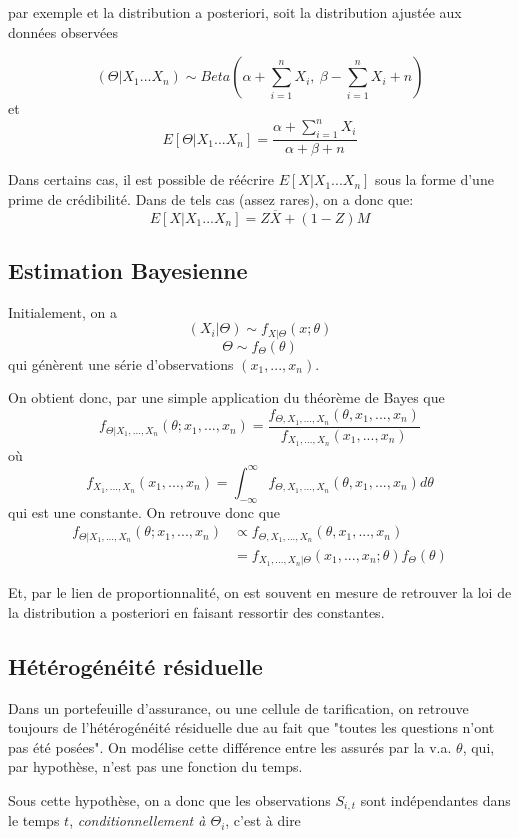 par exemple et la distribution a posteriori, soit la distribution ajustée aux données observées

$$(\Theta|X_1 ... X_n) \sim Beta \left( \alpha + \sum_{i=1}^nX_i,\  \beta - \sum_{i=1}^nX_i +n \right)$$
et 
$$E[\Theta|X_1 ... X_n]=\frac{\alpha + \sum_{i=1}^nX_i}{\alpha + \beta + n}$$


Dans certains cas, il est possible de réécrire $E[X|X_1 ... X_n]$ sous la forme d'une prime de crédibilité. Dans de tels cas (assez rares), on a donc que:
$$E[X|X_1 ... X_n] = Z \overline{X} + (1-Z)M$$

\subsection{Estimation Bayesienne}

Initialement, on a
$$(X_i|\Theta) \sim f_{X|\Theta}(x;\theta)$$
$$\Theta \sim f_{\Theta}(\theta)$$
qui génèrent une série d'observations $(x_1, ..., x_n)$.

On obtient donc, par une simple application du théorème de Bayes que
$$f_{\Theta|X_1,...,X_n}(\theta; x_1,...,x_n) = \frac{f_{\Theta,X_1,...,X_n}(\theta, x_1,...,x_n)}{f_{X_1,...,X_n}( x_1,...,x_n)}$$
où
$$f_{X_1,...,X_n}( x_1,...,x_n) = \int_{-\infty}^{\infty} f_{\Theta,X_1,...,X_n}(\theta, x_1,...,x_n) d\theta$$
qui est une constante.
On retrouve donc que 
$$ \begin{aligned} f_{\Theta|X_1,...,X_n}(\theta; x_1,...,x_n) &\propto  f_{\Theta,X_1,...,X_n}(\theta, x_1,...,x_n) \\
 &= f_{X_1,...,X_n|\Theta}(x_1,...,x_n;\theta) f_{\Theta}(\theta)  \end{aligned}$$

Et, par le lien de proportionnalité, on est souvent en mesure de retrouver la loi de la distribution a posteriori en faisant ressortir des constantes.

\subsection{Hétérogénéité résiduelle}

Dans un portefeuille d'assurance, ou une cellule de tarification, on retrouve toujours de l'hétérogénéité résiduelle due au fait que "toutes les questions n'ont pas été posées". On modélise cette différence entre les assurés par la v.a. $\theta$, qui, par hypothèse, n'est pas une fonction du temps. 

Sous cette hypothèse, on a donc que les observations $S_{i,t}$ sont indépendantes dans le temps $t$, \emph{conditionnellement à $\Theta_i$}, c'est à dire

